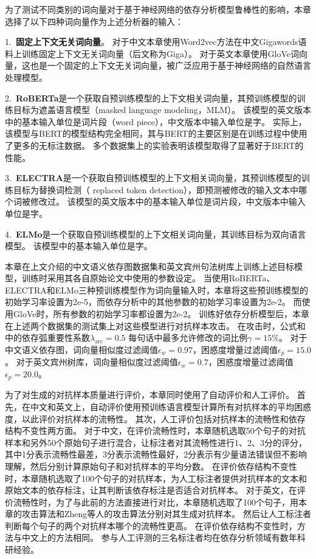 为了测试不同类别的词向量对于基于神经网络的依存分析模型鲁棒性的影响，本章选择了以下四种词向量作为上述分析器的输入：

1.\ \textbf{固定上下文无关词向量}。
对于中文本章使用Word2vec方法\cite{mikolov-etal-2013-distributed}在中文Gigawords语料上训练固定上下文无关词向量（后文称为Giga）。
对于英文本章使用GloVe词向量\cite{pennington-etal-2014-glove}，这也是一个固定的上下文无关词向量，被广泛应用于基于神经网络的自然语言处理模型。

2.\ \textbf{RoBERTa}\cite{liu-etal-2019-roberta}是一个获取自预训练模型的上下文相关词向量，其预训练模型的训练目标为遮盖语言模型（masked language modeling，MLM）。
该模型的英文版本中的基本输入单位是词片段（word piece），中文版本中输入单位是字。
实际上，该模型与BERT的模型结构完全相同，其与BERT的主要区别是在训练过程中使用了更多的无标注数据。
多个数据集上的实验表明该模型取得了显著好于BERT的性能。

3.\ \textbf{ELECTRA}\cite{clark-etal-2020-electra}是一个获取自预训练模型的上下文相关词向量，其预训练模型的训练目标为替换词检测（ replaced token detection），即预测被修改的输入文本中哪个词被修改过。
该模型的英文版本中的基本输入单位是词片段，中文版本中输入单位是字。

4.\ \textbf{ELMo}\cite{peters-etal-2018-deep}是一个获取自预训练模型的上下文相关词向量，其训练目标为双向语言模型。
该模型中的基本输入单位是字。

本章在上文介绍的中文语义依存图数据集和英文宾州句法树库上训练上述目标模型，训练时采用其各自原始论文中使用的参数设定。
当使用RoBERTa、ELECTRA和ELMo三种预训练模型作为词向量输入时，本章将这些预训练模型的初始学习率设置为2e-5，而依存分析中的其他参数的初始学习率设置为2e-2。
而使用GloVe时，所有参数的初始学习率都设置为2e-2。
训练好依存分析模型后，本章在上述两个数据集的测试集上对这些模型进行对抗样本攻击。
在攻击时，公式\label{eq:word-importance}和\label{eq:mis-inc}中的依存弧重要性系数$\lambda_{\text{arc}}=0.5$ 每句话中最多允许修改的词比例$\gamma=15\%$。
对于中文语义依存图，词向量相似度过滤阈值$\epsilon_w = 0.97$，困惑度增量过滤阈值$\epsilon_p = 15.0$。
对于英文宾州树库，词向量相似度过滤阈值$\epsilon_w = 0.7$，困惑度增量过滤阈值$\epsilon_p = 20.0$。

为了对生成的对抗样本质量进行评价，本章同时使用了自动评价和人工评价。
首先，在中文和英文上，自动评价使用预训练语言模型计算所有对抗样本的平均困惑度，以此评价对抗样本的流畅性。
其次，人工评价包括对抗样本的流畅性和依存结构不变性两方面。
对于中文，在评价流畅性时，本章随机选取50个句子的对抗样本和另外50个原始句子进行混合，让标注者对其流畅性进行1、2、3分的评分，其中1分表示流畅性最差，3分表示流畅性最好，2分表示有少量语法错误但不影响理解，然后分别计算原始句子和对抗样本的平均分数。
在评价依存结构不变性时，本章随机选取了100个句子的对抗样本，为人工标注者提供对抗样本的文本和原始文本的依存标注，让其判断该依存标注是否适合对抗样本。
对于英文，在评价流畅性时，为了与此前的方法直接进行对比，本章随机选取了100个句子，用本章的攻击算法和Zheng等人\cite{zheng-etal-2020-evaluating}的攻击算法分别对其生成对抗样本。
然后让人工标注者判断每个句子的两个对抗样本哪个的流畅性更高。
在评价依存结构不变性时，方法与中文上的方法相同。
参与人工评测的三名标注者均在依存分析领域有数年科研经验。

